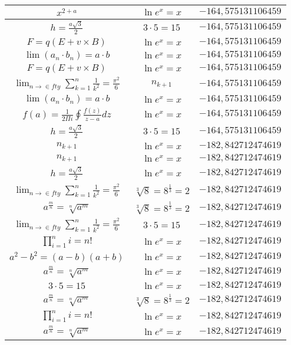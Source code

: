 \documentclass{article}
\begin{document}
\begin{flushleft}
\begin{longtable}{|c|c|c|}
$x^{2+a}$ & $\ln e^x=x$ & $-164,575131106459$ \\ \hline 
$h=\frac{a\sqrt{3}}{2}$ & $3\cdot 5=15$ & $-164,575131106459$ \\ \hline 
$F=q\left(E+v\times B\right)$ & $\ln e^x=x$ & $-164,575131106459$ \\ \hline 
$\lim\left(a_n\cdot b_n\right)=a\cdot b$ & $\ln e^x=x$ & $-164,575131106459$ \\ \hline 
$F=q\left(E+v\times B\right)$ & $\ln e^x=x$ & $-164,575131106459$ \\ \hline 
$\lim_{n\to\in fty}\sum_{k=1}^n\frac{1}{k^2}=\frac{\pi^2}{6}$ & $n_{k+1}$ & $-164,575131106459$ \\ \hline 
$\lim\left(a_n\cdot b_n\right)=a\cdot b$ & $\ln e^x=x$ & $-164,575131106459$ \\ \hline 
$f\left(a\right)=\frac{1}{2\Pi i}\oint\frac{f\left(z\right)}{z-a}dz$ & $\ln e^x=x$ & $-164,575131106459$ \\ \hline 
$h=\frac{a\sqrt{3}}{2}$ & $3\cdot 5=15$ & $-164,575131106459$ \\ \hline 
$n_{k+1}$ & $\ln e^x=x$ & $-182,842712474619$ \\ \hline 
$n_{k+1}$ & $\ln e^x=x$ & $-182,842712474619$ \\ \hline 
$h=\frac{a\sqrt{3}}{2}$ & $\ln e^x=x$ & $-182,842712474619$ \\ \hline 
$\lim_{n\to\in fty}\sum_{k=1}^n\frac{1}{k^2}=\frac{\pi^2}{6}$ & $\sqrt[3]{8}=8^{\frac{1}{3}}=2$ & $-182,842712474619$ \\ \hline 
$a^{\frac{m}{n}}=\sqrt[n]{a^{m}}$ & $\sqrt[3]{8}=8^{\frac{1}{3}}=2$ & $-182,842712474619$ \\ \hline 
$\lim_{n\to\in fty}\sum_{k=1}^n\frac{1}{k^2}=\frac{\pi^2}{6}$ & $3\cdot 5=15$ & $-182,842712474619$ \\ \hline 
$\prod_{i=1}^ni=n!$ & $\ln e^x=x$ & $-182,842712474619$ \\ \hline 
$a^2-b^2=(a-b)(a+b)$ & $\ln e^x=x$ & $-182,842712474619$ \\ \hline 
$a^{\frac{m}{n}}=\sqrt[n]{a^{m}}$ & $\ln e^x=x$ & $-182,842712474619$ \\ \hline 
$3\cdot 5=15$ & $\ln e^x=x$ & $-182,842712474619$ \\ \hline 
$a^{\frac{m}{n}}=\sqrt[n]{a^{m}}$ & $\sqrt[3]{8}=8^{\frac{1}{3}}=2$ & $-182,842712474619$ \\ \hline 
$\prod_{i=1}^ni=n!$ & $\ln e^x=x$ & $-182,842712474619$ \\ \hline 
$a^{\frac{m}{n}}=\sqrt[n]{a^{m}}$ & $\ln e^x=x$ & $-182,842712474619$ \\ \hline 

\end{longtable}
\end{flushleft}
\end{document}
